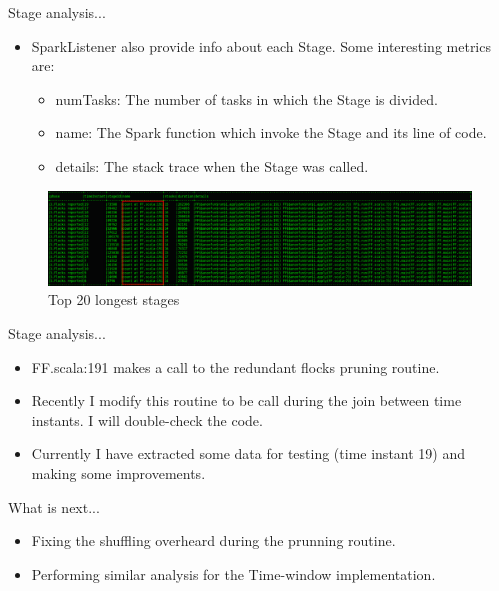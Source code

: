 \documentclass{beamer}
\begin{document}
\begin{frame}{Stage analysis...}
    \begin{itemize}
        \item SparkListener also provide info about each Stage.  Some interesting metrics are:
        \begin{itemize}
            \item numTasks: The number of tasks in which the Stage is divided.
            \item name: The Spark function which invoke the Stage and its line of code.
            \item details: The stack trace when the Stage was called.
        \end{itemize}
    \end{itemize}

    \begin{figure}
        \includegraphics[width=1\textwidth]{figures/StageAnalysisFF1}
        \caption{\small Top 20 longest stages}
    \end{figure}
\end{frame}

\begin{frame}{Stage analysis...}
    \begin{itemize}
        \item FF.scala:191 makes a call to the redundant flocks pruning routine.
        \item Recently I modify this routine to be call during the join between time instants.  I will double-check the code.
        \item Currently I have extracted some data for testing (time instant 19) and making some improvements.
    \end{itemize}
\end{frame}

\begin{frame}{What is next...}
    \begin{itemize}
        \item Fixing the shuffling overheard during the prunning routine.
        \item Performing similar analysis for the Time-window implementation.
    \end{itemize}
\end{frame}
\end{document}
